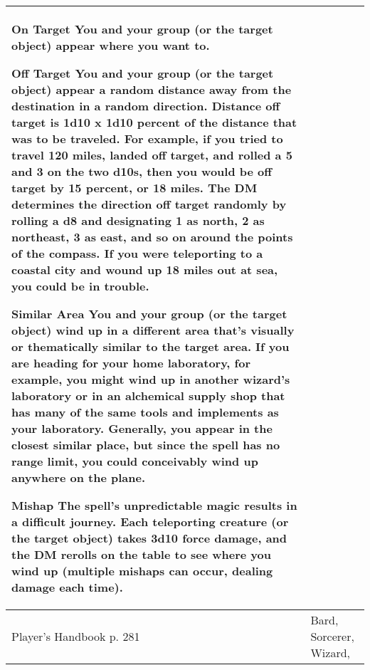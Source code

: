 \documentclass[11pt]{report}
\begin{document}
\begin{table}[H]
\begin{tabular}{||p{6cm}|p{6cm}||}
{On Target
You and your group (or the target object) appear where you want to.

Off Target
You and your group (or the target object) appear a random distance away from the destination in a random direction. Distance off target is 1d10 x 1d10 percent of the distance that was to be traveled. For example, if you tried to travel 120 miles, landed off target, and rolled a 5 and 3 on the two d10s, then you would be off target by 15 percent, or 18 miles. The DM determines the direction off target randomly by rolling a d8 and designating 1 as north, 2 as northeast, 3 as east, and so on around the points of the compass. If you were teleporting to a coastal city and wound up 18 miles out at sea, you could be in trouble.

Similar Area
You and your group (or the target object) wind up in a different area that's visually or thematically similar to the target area. If you are heading for your home laboratory, for example, you might wind up in another wizard's laboratory or in an alchemical supply shop that has many of the same tools and implements as your laboratory. Generally, you appear in the closest similar place, but since the spell has no range limit, you could conceivably wind up anywhere on the plane.

Mishap
The spell's unpredictable magic results in a difficult journey. Each teleporting creature (or the target object) takes 3d10 force damage, and the DM rerolls on the table to see where you wind up (multiple mishaps can occur, dealing damage each time).}\\ \hline
Player's Handbook p. 281 & Bard, Sorcerer, Wizard, \\ \hline\hline
	\end{tabular}
\end{table}
\end{document}
